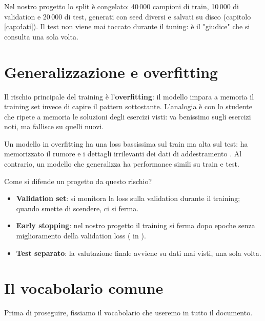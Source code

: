 Nel nostro progetto lo split è congelato: 40\,000 campioni di train, 10\,000
di validation e 20\,000 di test, generati con seed diversi e salvati su
disco (capitolo \ref{cap:dati}). Il test non viene mai toccato durante il
tuning: è il "giudice" che si consulta una sola volta.

\section{Generalizzazione e overfitting}\label{sec:generalizzazione-overfitting}

Il rischio principale del training è l'\textbf{overfitting}: il modello
impara a memoria il training set invece di capire il pattern sottostante.
L'analogia è con lo studente che ripete a memoria le soluzioni degli
esercizi visti: va benissimo sugli esercizi noti, ma fallisce su quelli
nuovi.

Un modello in overfitting ha una loss bassissima sul train ma alta sul test:
ha memorizzato il rumore e i dettagli irrilevanti dei dati di addestramento
\cite{bishop2006pattern}. Al contrario, un modello che generalizza ha
performance simili su train e test.

Come si difende un progetto da questo rischio?

\begin{itemize}
  \item \textbf{Validation set}: si monitora la loss sulla validation durante
        il training; quando smette di scendere, ci si ferma.
  \item \textbf{Early stopping}: nel nostro progetto il training si ferma
        dopo  epoche senza miglioramento della validation
        loss ( in ).
  \item \textbf{Test separato}: la valutazione finale avviene su dati mai
        visti, una sola volta.
\end{itemize}

\section{Il vocabolario comune}\label{sec:vocabolario-comune}

Prima di proseguire, fissiamo il vocabolario che useremo in tutto il
documento.


